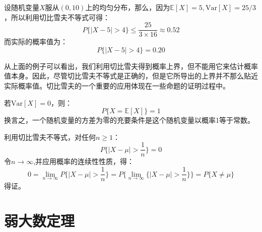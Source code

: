 \documentclass[10pt,a4paper,UTF8]{article}
\begin{document}
\begin{tikzinstance}
设随机变量\(X\)服从\((0,10)\)上的均匀分布，那么，因为\(\mathbb{E}[X] = 5, \mathrm{Var}[X]= 25/3\)，所以利用切比雪夫不等式可得：
\begin{equation}
\label{eq:8}
P\{ |X-5| > 4 \} \leq \frac{25}{3\times 16} \approx 0.52
\end{equation}
而实际的概率值为：
\begin{equation}
\label{eq:9}
P\{ |X-5| > 4 \} = 0.20
\end{equation}
\end{tikzinstance}
从上面的例子可以看出，我们利用切比雪夫得到概率上界，但不能用它来估计概率值本身。因此，尽管切比雪夫不等式是正确的，但是它所导出的上界并不那么贴近实际概率值。切比雪夫的一个重要的应用体现在一些命题的证明过程中。

\begin{tikztheorem}
若\(\mathrm{Var}[X] = 0\)，则：
\begin{equation}
\label{eq:10}
P\{X = \mathbb{E}[X]\} = 1
\end{equation}
换言之，一个随机变量的方差为零的充要条件是这个随机变量以概率1等于常数。
\end{tikztheorem}

\begin{tikzproof}
利用切比雪夫不等式，对任何\(n\geq 1\)：
\begin{equation}
\label{eq:11}
P\{ |X - \mu| > \frac{1}{n} \} = 0
\end{equation}
令\(n\to \infty\),并应用概率的连续性性质，得：
\begin{equation}
\label{eq:12}
0 = \lim_{n\to\infty}P\{ |X-\mu| > \frac{1}{n} \} = P\{\lim_{n\to\infty}\{ |X-\mu| > \frac{1}{n} \}\} = P\{X\neq \mu\}
\end{equation}
得证。
\end{tikzproof}

\section{弱大数定理}
\label{sec:org496833a}
\end{document}
